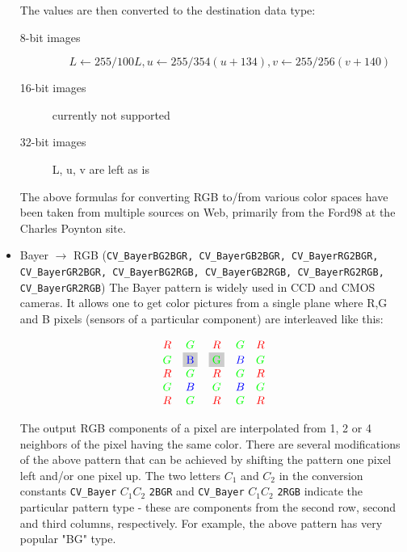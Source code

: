 \begin{itemize}
The values are then converted to the destination data type:
\begin{description}
\item[8-bit images]
\[L \leftarrow 255/100 L, u \leftarrow 255/354 (u + 134), v \leftarrow 255/256 (v + 140) \]
\item[16-bit images] currently not supported
\item[32-bit images] L, u, v are left as is
\end{description}

The above formulas for converting RGB to/from various color spaces have been taken from multiple sources on Web, primarily from
the Ford98
 at the Charles Poynton site.

 \item Bayer $\rightarrow$ RGB (\texttt{CV\_BayerBG2BGR, CV\_BayerGB2BGR, CV\_BayerRG2BGR, CV\_BayerGR2BGR, CV\_BayerBG2RGB, CV\_BayerGB2RGB, CV\_BayerRG2RGB, CV\_BayerGR2RGB}) The Bayer pattern is widely used in CCD and CMOS cameras. It allows one to get color pictures from a single plane where R,G and B pixels (sensors of a particular component) are interleaved like this:

\newcommand{\Rcell}{\color{red}R}
\newcommand{\Gcell}{\color{green}G}
\newcommand{\Bcell}{\color{blue}B}


\[
\definecolor{BackGray}{rgb}{0.8,0.8,0.8}
\begin{array}{ c c c c c }
\Rcell&\Gcell&\Rcell&\Gcell&\Rcell\\
\Gcell&\colorbox{BackGray}{\Bcell}&\colorbox{BackGray}{\Gcell}&\Bcell&\Gcell\\
\Rcell&\Gcell&\Rcell&\Gcell&\Rcell\\
\Gcell&\Bcell&\Gcell&\Bcell&\Gcell\\
\Rcell&\Gcell&\Rcell&\Gcell&\Rcell
\end{array}
\]

The output RGB components of a pixel are interpolated from 1, 2 or
4 neighbors of the pixel having the same color. There are several
modifications of the above pattern that can be achieved by shifting
the pattern one pixel left and/or one pixel up. The two letters
$C_1$ and $C_2$
in the conversion constants
\texttt{CV\_Bayer} $ C_1 C_2 $ \texttt{2BGR}
and
\texttt{CV\_Bayer} $ C_1 C_2 $ \texttt{2RGB}
indicate the particular pattern
type - these are components from the second row, second and third
columns, respectively. For example, the above pattern has very
popular "BG" type.
\end{itemize}

